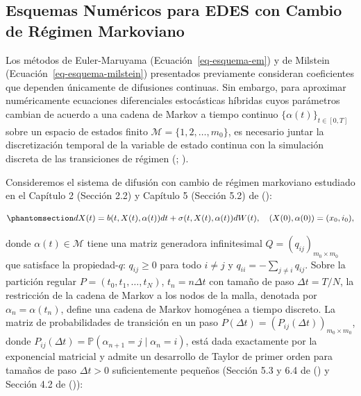 \documentclass[
  spanish,
  letterpaper,
  DIV=11,
  numbers=noendperiod]{scrreprt}
\theoremstyle{plain}
\theoremstyle{plain}
\theoremstyle{plain}
\theoremstyle{definition}
\theoremstyle{remark}
\begin{document}
\subsection{Esquemas Numéricos para EDES con Cambio de Régimen
Markoviano}\label{sec-numerico-switching}

Los métodos de Euler-Maruyama (Ecuación~\ref{eq-esquema-em}) y de
Milstein (Ecuación~\ref{eq-esquema-milstein}) presentados previamente
consideran coeficientes que dependen únicamente de difusiones continuas.
Sin embargo, para aproximar numéricamente ecuaciones diferenciales
estocásticas híbridas cuyos parámetros cambian de acuerdo a una cadena
de Markov a tiempo continuo \(\{\alpha(t)\}_{t \in [0, T]}\) sobre un
espacio de estados finito \(\mathcal{M} = \{1, 2, \dots, m_0\}\), es
necesario juntar la discretización temporal de la variable de estado
continua con la simulación discreta de las transiciones de régimen
(;
).

Consideremos el sistema de difusión con cambio de régimen markoviano
estudiado en el Capítulo 2 (Sección 2.2) y Capítulo 5 (Sección 5.2) de
():

\begin{equation}\phantomsection\label{eq-ede-switching-num}{
dX(t) = b(t, X(t), \alpha(t))dt + \sigma(t, X(t), \alpha(t))dW(t), \quad (X(0), \alpha(0)) = (x_0, i_0),
}\end{equation}

donde \(\alpha(t) \in \mathcal{M}\) tiene una matriz generadora
infinitesimal \(Q = (q_{ij})_{m_0 \times m_0}\) que satisface la
propiedad-\(q\): \(q_{ij} \ge 0\) para todo \(i \neq j\) y
\(\displaystyle q_{ii} = -\sum_{j \neq i} q_{ij}\). Sobre la partición
regular \(P = (t_0, t_1, \dots, t_N)\), \(t_n = n\Delta t\) con tamaño
de paso \(\Delta t = T/N\), la restricción de la cadena de Markov a los
nodos de la malla, denotada por \(\alpha_n = \alpha(t_n)\), define una
cadena de Markov homogénea a tiempo discreto. La matriz de
probabilidades de transición en un paso
\(P(\Delta t) = (P_{ij}(\Delta t))_{m_0 \times m_0}\), donde
\(P_{ij}(\Delta t) = \mathbb{P}(\alpha_{n+1} = j \mid \alpha_n = i)\),
está dada exactamente por la exponencial matricial y admite un
desarrollo de Taylor de primer orden para tamaños de paso
\(\Delta t > 0\) suficientemente pequeños (Sección 5.3 y 6.4 de
() y Sección 4.2 de
()):
\end{document}
